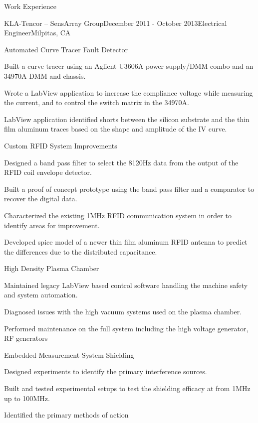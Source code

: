 \documentclass{resume} %
\begin{document}
\begin{rSection}{Work Experience}
\begin{rSubsection2}{KLA-Tencor -- SensArray Group}{December 2011 - October 2013}{Electrical Engineer}{Milpitas, CA}
\pagebreak[3]
\begin{rWorkProject}{Automated Curve Tracer Fault Detector}
\item Built a curve tracer using an Aglient U3606A power supply/DMM combo and an 34970A DMM and chassis.
\item Wrote a LabView application to increase the compliance voltage while measuring the current, and to control the switch matrix in the 34970A.
\item LabView application identified shorts between the silicon substrate and the thin film aluminum traces based on the shape and amplitude of the IV curve.
\end{rWorkProject}

\pagebreak[3]
\begin{rWorkProject}{Custom RFID System Improvements}
\item Designed a band pass filter to select the 8120Hz data from the output of the RFID coil envelope detector.
\item Built a proof of concept prototype using the band pass filter and a comparator to recover the digital data.
\item Characterized the existing 1MHz RFID communication system in order to identify areas for improvement.
\item Developed spice model of a newer thin film aluminum RFID antenna to predict the differences due to the distributed capacitance. 
\end{rWorkProject}

\pagebreak[3]
\begin{rWorkProject}{High Density Plasma Chamber}
\item Maintained legacy LabView based control software handling the machine safety and system automation.
\item Diagnosed issues with the high vacuum systems used on the plasma chamber.
\item Performed maintenance on the full system including the high voltage generator, RF generators 
\end{rWorkProject}

\pagebreak[3]
\begin{rWorkProject}{Embedded Measurement System Shielding}
\item Designed experiments to identify the primary interference sources.
\item Built and tested experimental setups to test the shielding efficacy at from 1MHz up to 100MHz.
\item Identified the primary methods of action 
\end{rWorkProject}


\end{rSubsection2}
\end{rSection}
\end{document}
